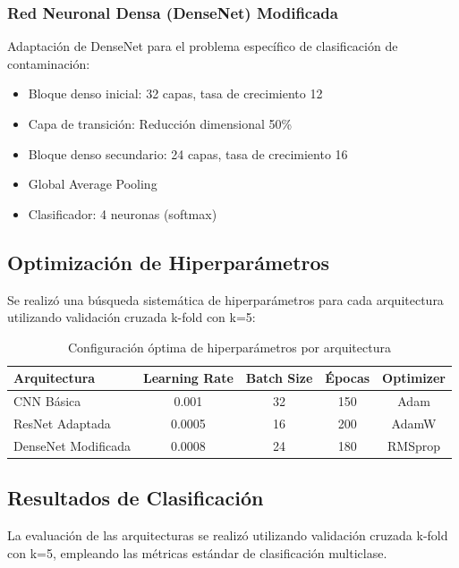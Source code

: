 \subsubsection{Red Neuronal Densa (DenseNet) Modificada}

Adaptación de DenseNet para el problema específico de clasificación de contaminación:
\begin{itemize}
    \item Bloque denso inicial: 32 capas, tasa de crecimiento 12
    \item Capa de transición: Reducción dimensional 50\%
    \item Bloque denso secundario: 24 capas, tasa de crecimiento 16
    \item Global Average Pooling
    \item Clasificador: 4 neuronas (softmax)
\end{itemize}

\subsection{Optimización de Hiperparámetros}

Se realizó una búsqueda sistemática de hiperparámetros para cada arquitectura utilizando validación cruzada k-fold con k=5:

\begin{table}[h!]
\centering
\caption{Configuración óptima de hiperparámetros por arquitectura}
\begin{tabular}{|l|c|c|c|c|}
\hline
\textbf{Arquitectura} & \textbf{Learning Rate} & \textbf{Batch Size} & \textbf{Épocas} & \textbf{Optimizer} \\
\hline
CNN Básica & 0.001 & 32 & 150 & Adam \\
\hline
ResNet Adaptada & 0.0005 & 16 & 200 & AdamW \\
\hline
DenseNet Modificada & 0.0008 & 24 & 180 & RMSprop \\
\hline
\end{tabular}
\label{tab:hyperparameter_optimization}
\end{table}

\subsection{Resultados de Clasificación}

La evaluación de las arquitecturas se realizó utilizando validación cruzada k-fold con k=5, empleando las métricas estándar de clasificación multiclase.

